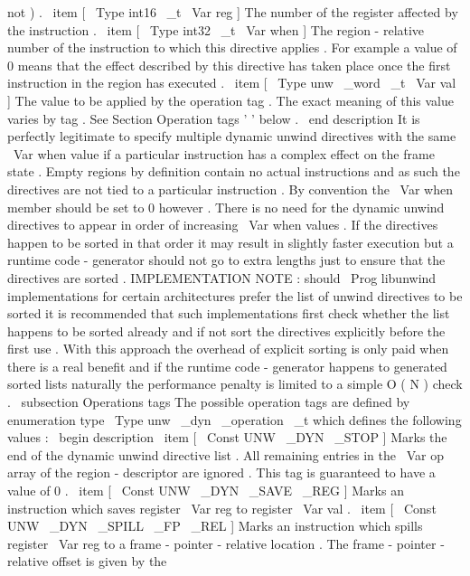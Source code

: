 not
)
.
\
item
[
\
Type
{
int16
\
_t
}
\
Var
{
reg
}
]
The
number
of
the
register
affected
by
the
instruction
.
\
item
[
\
Type
{
int32
\
_t
}
\
Var
{
when
}
]
The
region
-
relative
number
of
the
instruction
to
which
this
directive
applies
.
For
example
a
value
of
0
means
that
the
effect
described
by
this
directive
has
taken
place
once
the
first
instruction
in
the
region
has
executed
.
\
item
[
\
Type
{
unw
\
_word
\
_t
}
\
Var
{
val
}
]
The
value
to
be
applied
by
the
operation
tag
.
The
exact
meaning
of
this
value
varies
by
tag
.
See
Section
Operation
tags
'
'
below
.
\
end
{
description
}
It
is
perfectly
legitimate
to
specify
multiple
dynamic
unwind
directives
with
the
same
\
Var
{
when
}
value
if
a
particular
instruction
has
a
complex
effect
on
the
frame
state
.
Empty
regions
by
definition
contain
no
actual
instructions
and
as
such
the
directives
are
not
tied
to
a
particular
instruction
.
By
convention
the
\
Var
{
when
}
member
should
be
set
to
0
however
.
There
is
no
need
for
the
dynamic
unwind
directives
to
appear
in
order
of
increasing
\
Var
{
when
}
values
.
If
the
directives
happen
to
be
sorted
in
that
order
it
may
result
in
slightly
faster
execution
but
a
runtime
code
-
generator
should
not
go
to
extra
lengths
just
to
ensure
that
the
directives
are
sorted
.
IMPLEMENTATION
NOTE
:
should
\
Prog
{
libunwind
}
implementations
for
certain
architectures
prefer
the
list
of
unwind
directives
to
be
sorted
it
is
recommended
that
such
implementations
first
check
whether
the
list
happens
to
be
sorted
already
and
if
not
sort
the
directives
explicitly
before
the
first
use
.
With
this
approach
the
overhead
of
explicit
sorting
is
only
paid
when
there
is
a
real
benefit
and
if
the
runtime
code
-
generator
happens
to
generated
sorted
lists
naturally
the
performance
penalty
is
limited
to
a
simple
O
(
N
)
check
.
\
subsection
{
Operations
tags
}
The
possible
operation
tags
are
defined
by
enumeration
type
\
Type
{
unw
\
_dyn
\
_operation
\
_t
}
which
defines
the
following
values
:
\
begin
{
description
}
\
item
[
\
Const
{
UNW
\
_DYN
\
_STOP
}
]
Marks
the
end
of
the
dynamic
unwind
directive
list
.
All
remaining
entries
in
the
\
Var
{
op
}
array
of
the
region
-
descriptor
are
ignored
.
This
tag
is
guaranteed
to
have
a
value
of
0
.
\
item
[
\
Const
{
UNW
\
_DYN
\
_SAVE
\
_REG
}
]
Marks
an
instruction
which
saves
register
\
Var
{
reg
}
to
register
\
Var
{
val
}
.
\
item
[
\
Const
{
UNW
\
_DYN
\
_SPILL
\
_FP
\
_REL
}
]
Marks
an
instruction
which
spills
register
\
Var
{
reg
}
to
a
frame
-
pointer
-
relative
location
.
The
frame
-
pointer
-
relative
offset
is
given
by
the
